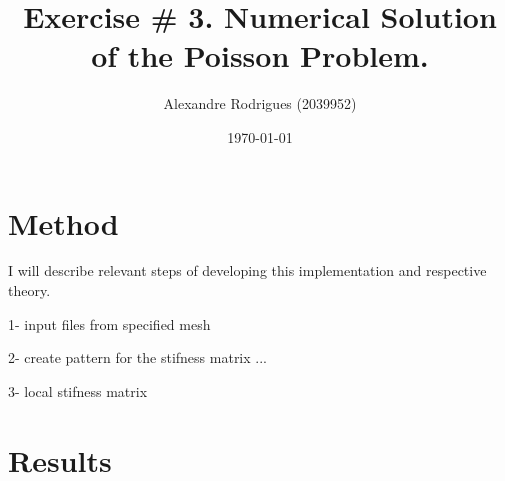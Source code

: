 \documentclass[a4paper, 11pt]{article}
\begin{document}
	
	\title{Exercise \# 3. Numerical Solution of the Poisson Problem. }
	\author{{\small Alexandre Rodrigues (2039952)}}
	\date{\today}
	
	\maketitle
		\section{Method}
			I will describe relevant steps of developing this implementation and respective theory.
			
			1- input files from specified mesh
			
			2- create pattern for the stifness matrix
			...
			
			3- local stifness matrix
			
		
		
		\section{Results}
		
\end{document}
